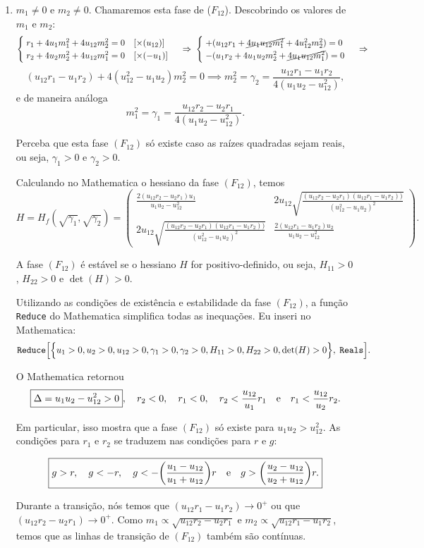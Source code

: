 \documentclass[a4paper,10pt]{article}
\begin{document}
\begin{enumerate}
\item $m_1 \neq 0$ e $m_2 \neq 0$. Chamaremos esta fase de ($F_{12}$). Descobrindo os valores de $m_1$ e $m_2$:
$$
\begin{cases}
\; r_1 + 4 u_1 m_1^2 + 4 u_{12} m_2^2 = 0 \quad [\times (u_{12})] \\
\; r_2 + 4 u_2 m_2^2 + 4 u_{12} m_1^2 = 0 \quad [\times (-u_{1})]
\end{cases}
\implies
\begin{cases}
\; + (u_{12} r_1 + \cancel{4 u_1 u_{12} m_1^2} + 4 u_{12}^2 m_2^2) = 0 \\
\; - (u_1 r_2 + 4 u_1 u_2 m_2^2 + \cancel{4 u_1 u_{12} m_1^2}) = 0
\end{cases}
\implies
$$
$$
(u_{12} r_1 - u_1 r_2) + 4 (u_{12}^2 - u_1 u_2) m_2^2 = 0 \implies
\boxed{ m_2^2 = \gamma_2 = \frac{u_{12} r_1 - u_1 r_2}{4 (u_1 u_2 - u_{12}^2)}, }
$$
e de maneira análoga
$$
\boxed{ m_1^2 = \gamma_1 = \frac{u_{12} r_2 - u_2 r_1}{4 (u_1 u_2 - u_{12}^2)}. }
$$

Perceba que esta fase $(F_{12})$ só existe caso as raízes quadradas sejam reais, ou seja, $\gamma_1 > 0$ e $\gamma_2 > 0$.


Calculando no Mathematica o hessiano da fase $(F_{12})$, temos
$$
H = H_f(\sqrt{\gamma_1}, \sqrt{\gamma_2}) =
\begin{pmatrix}
\frac{2 (u_{12} r_2 - u_2 r_1) u_1}{u_1 u_2 - u_{12}^2} &
2 u_{12} \sqrt{\frac{(u_{12} r_2 - u_2 r_1)(u_{12} r_1 - u_1 r_2))}{(u_{12}^2 - u_1 u_2)^2}} \\
2 u_{12} \sqrt{\frac{(u_{12} r_2 - u_2 r_1)(u_{12} r_1 - u_1 r_2))}{(u_{12}^2 - u_1 u_2)^2}} &
\frac{2 (u_{12} r_1 - u_1 r_2) u_2}{u_1 u_2 - u_{12}^2}
\end{pmatrix}.
$$

A fase $(F_{12})$ é estável se o hessiano $H$ for positivo-definido, ou seja, $H_{11}>0$, $H_{22}>0$ e $\det(H)>0$.

Utilizando as condições de existência e estabilidade da fase $(F_{12})$, a função \texttt{Reduce} do Mathematica simplifica todas as inequações. Eu inseri no Mathematica:
$$
\texttt{Reduce}\qty[\Big\{u_1 > 0, u_2 > 0, u_{12} > 0, \gamma_1 > 0, \gamma_2 > 0,
H_{11} > 0, H_{22} > 0, \det(H) > 0\Big\},
\; \texttt{Reals}].
$$

O Mathematica retornou
$$
\boxed{\Delta = u_1 u_2 - u_{12}^2 > 0}, \quad
r_2 < 0, \quad
r_1 < 0, \quad
r_2 < \frac{u_{12}}{u_1} r_1 \e
r_1 < \frac{u_{12}}{u_2} r_2.
$$

Em particular, isso mostra que a fase $(F_{12})$ só existe para $u_1 u_2 > u_{12}^2$. As condições para $r_1$ e $r_2$ se traduzem nas condições para $r$ e $g$:

$$
\boxed{
g > r, \quad
g < -r, \quad
g < -\qty(\frac{u_1 - u_{12}}{u_1 + u_{12}}) r \e
g > \qty(\frac{u_2 - u_{12}}{u_2 + u_{12}}) r. }
$$

Durante a transição, nós temos que $(u_{12} r_1 - u_1 r_2) \to 0^+$ ou que $(u_{12} r_2 - u_2 r_1) \to 0^+$. Como
$m_1 \propto \sqrt{u_{12} r_2 - u_2 r_1}$ e $m_2 \propto \sqrt{u_{12} r_1 - u_1 r_2}$, temos que as linhas de transição de $(F_{12})$ também são contínuas.


\end{enumerate}
\end{document}
